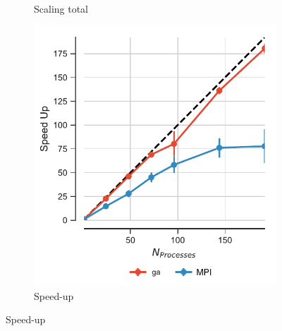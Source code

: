 \begin{figure}[!htb]
\begin{subfigure}{.3\textwidth}
    \caption{Scaling total}
    \label{fig:MPIscaling-split}
  \end{subfigure}
  \hfill
  \begin{subfigure}{.3\textwidth}
    \includegraphics[width=\linewidth]{figures/Comparison_Speed_UP_traj_splitting_edited.pdf}
    \captionsetup{format=hang}
    \caption{Speed-up}
    \label{fig:MPIspeedup-split}
  \end{subfigure}
  \bigskip


\end{figure}
